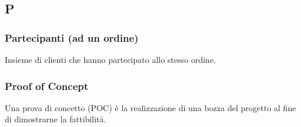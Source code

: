 \subsection{P}

\subsubsection{Partecipanti (ad un ordine)}
Insieme di clienti che hanno partecipato allo stesso ordine\g.

\subsubsection{Proof of Concept}
Una prova di concetto (POC\g) è la realizzazione di una bozza del progetto al fine di dimostrarne la fattibilità.